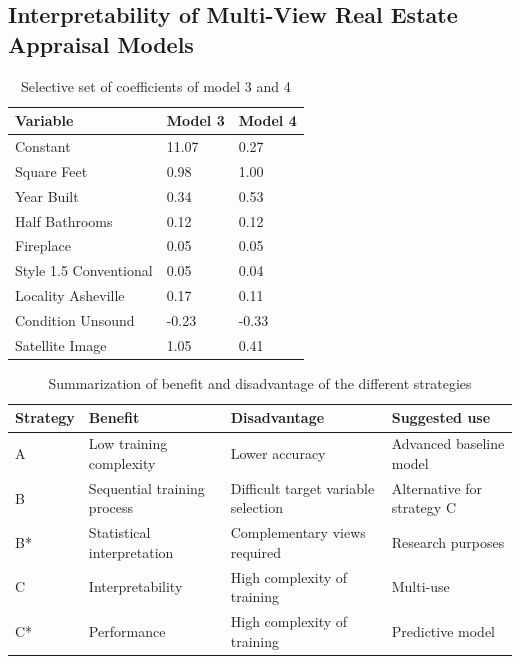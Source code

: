\documentclass[letterpaper]{article}
\begin{document}
\subsection{Interpretability of Multi-View Real Estate Appraisal Models}

\begin{table}[b]
\centering
\begin{tabular}{|l|l|l|}
\hline
\textbf{Variable} & \textbf{Model 3} & \textbf{Model 4} \\ \hline
Constant & 11.07 & 0.27 \\
Square Feet  & 0.98  & 1.00 \\
Year Built  & 0.34 & 0.53 \\
Half Bathrooms   & 0.12 & 0.12 \\
Fireplace & 0.05 & 0.05 \\
Style 1.5 Conventional & 0.05 & 0.04 \\
Locality Asheville & 0.17 & 0.11 \\
Condition Unsound & -0.23 & -0.33 \\
\hline
Satellite Image  & 1.05 &  0.41 \\
\hline
\end{tabular}
\caption{Selective set of coefficients of model 3 and 4}
\label{tab:coefficients}
\end{table}

\begin{table}[t]
\centering
\begin{adjustbox}{width=1.28\columnwidth}
\begin{tabular}{|l|l|l|l|}
\hline
\textbf{Strategy} & \textbf{Benefit} & \textbf{Disadvantage} & \textbf{Suggested use} \\ \hline
A & Low training complexity & Lower accuracy & Advanced baseline model \\ \hline
B & Sequential training process & Difficult target variable selection & Alternative for strategy C \\ \hline
B* & Statistical interpretation & Complementary views required & Research purposes \\ \hline
C & Interpretability & High complexity of training & Multi-use \\  \hline
C* & Performance & High complexity of training & Predictive model \\
\hline
\end{tabular}
\end{adjustbox}
\caption{Summarization of benefit and disadvantage of the different strategies}
\label{tab:strength}
\end{table}
\end{document}
